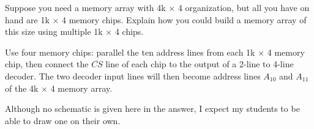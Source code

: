 

Suppose you need a memory array with 4k $\times$ 4 organization, but all you have on hand are 1k $\times$ 4 memory chips.  Explain how you could build a memory array of this size using multiple 1k $\times$ 4 chips.







Use four memory chips: parallel the ten address lines from each 1k $\times$ 4 memory chip, then connect the $\overline{CS}$ line of each chip to the output of a 2-line to 4-line decoder.  The two decoder input lines will then become address lines $A_{10}$ and $A_{11}$ of the 4k $\times$ 4 memory array.







Although no schematic is given here in the answer, I expect my students to be able to draw one on their own.




